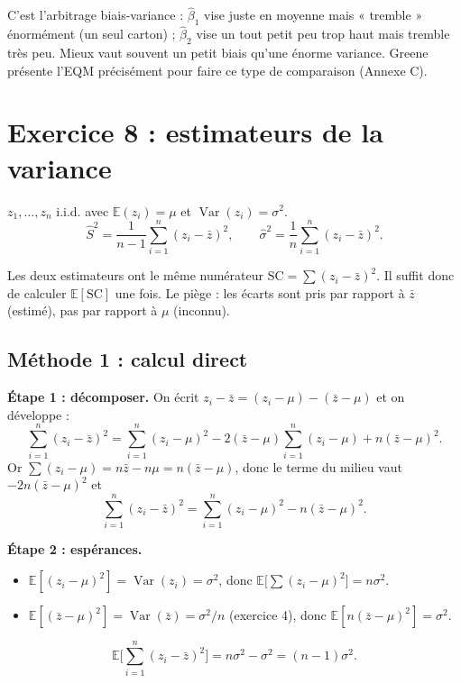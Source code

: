 \documentclass[11pt,a4paper]{article}
\newcommand{\E}{\mathbb{E}}\newcommand{\Var}{\operatorname{Var}}\newcommand{\Cov}{\operatorname{Cov}}
\newcommand{\sumi}{\sum_{i=1}^{n}}
\begin{document}
\begin{intuition}
C'est l'arbitrage biais-variance : $\hat\beta_1$ vise juste en moyenne mais « tremble » énormément (un seul carton) ; $\hat\beta_2$ vise un tout petit peu trop haut mais tremble très peu. Mieux vaut souvent un petit biais qu'une énorme variance. Greene présente l'EQM précisément pour faire ce type de comparaison (Annexe C).
\end{intuition}

\section{Exercice 8 : estimateurs de la variance}

$z_1,\dots,z_n$ i.i.d. avec $\E(z_i)=\mu$ et $\Var(z_i)=\sigma^2$.
\[
\hat S^2=\frac1{n-1}\sumi(z_i-\bar z)^2,\qquad \hat\sigma^2=\frac1n\sumi(z_i-\bar z)^2 .
\]

\begin{idee}
Les deux estimateurs ont le même numérateur $\text{SC}=\sum(z_i-\bar z)^2$. Il suffit donc de calculer $\E[\text{SC}]$ une fois. Le piège : les écarts sont pris par rapport à $\bar z$ (estimé), pas par rapport à $\mu$ (inconnu).
\end{idee}

\subsection*{Méthode 1 : calcul direct}

\textbf{Étape 1 : décomposer.} On écrit $z_i-\bar z=(z_i-\mu)-(\bar z-\mu)$ et on développe :
\[
\sumi(z_i-\bar z)^2=\sumi(z_i-\mu)^2-2(\bar z-\mu)\sumi(z_i-\mu)+n(\bar z-\mu)^2 .
\]
Or $\sum(z_i-\mu)=n\bar z-n\mu=n(\bar z-\mu)$, donc le terme du milieu vaut $-2n(\bar z-\mu)^2$ et
\[
\sumi(z_i-\bar z)^2=\sumi(z_i-\mu)^2-n(\bar z-\mu)^2 .
\]

\textbf{Étape 2 : espérances.}
\begin{itemize}[nosep]
\item $\E[(z_i-\mu)^2]=\Var(z_i)=\sigma^2$, donc $\E\big[\sum(z_i-\mu)^2\big]=n\sigma^2$.
\item $\E[(\bar z-\mu)^2]=\Var(\bar z)=\sigma^2/n$ (exercice 4), donc $\E[n(\bar z-\mu)^2]=\sigma^2$.
\end{itemize}
\[
\E\Big[\sumi(z_i-\bar z)^2\Big]=n\sigma^2-\sigma^2=(n-1)\sigma^2 .
\]
\end{document}
